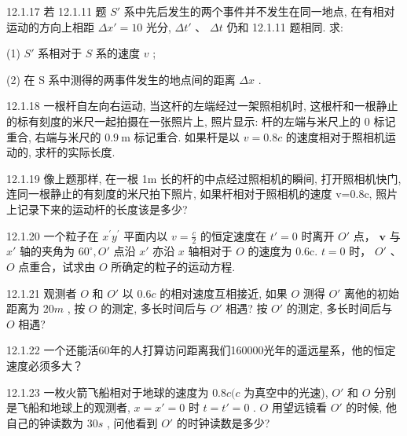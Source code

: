 \begin{problem}{12.1.17}
若 12.1.11 题 $S'$ 系中先后发生的两个事件并不发生在同一地点, 在有相对运动的方向上相距 $\Delta x' = 10$ 光分, $\Delta t'$ 、 $\Delta t$ 仍和 12.1.11 题相同. 求:

(1) $S'$ 系相对于 $S$ 系的速度 $v$ ;

(2) 在 S 系中测得的两事件发生的地点间的距离 $\Delta x$ .
\end{problem}
\clearpage


\begin{problem}{12.1.18}
一根杆自左向右运动, 当这杆的左端经过一架照相机时, 这根杆和一根静止的标有刻度的米尺一起拍摄在一张照片上, 照片显示: 杆的左端与米尺上的 0 标记重合, 右端与米尺的 $0.9 \mathrm{~m}$ 标记重合. 如果杆是以 $v = 0.8 c$ 的速度相对于照相机运动的, 求杆的实际长度.
\end{problem}
\clearpage


\begin{problem}{12.1.19}
像上题那样, 在一根 1m 长的杆的中点经过照相机的瞬间, 打开照相机快门, 连同一根静止的有刻度的米尺拍下照片, 如果杆相对于照相机的速度 v=0.8c, 照片上记录下来的运动杆的长度该是多少?
\end{problem}
\clearpage


\begin{problem}{12.1.20}
一个粒子在 $x^{\prime}y^{\prime}$ 平面内以 $v = \frac{c}{2}$ 的恒定速度在 $t' = 0$ 时离开 $O'$ 点， $\bm{v}$ 与 $x'$ 轴的夹角为 $60^{\circ}, O'$ 点沿 $x'$ 亦沿 $x$ 轴相对于 $O$ 的速度为 0.6c. $t = 0$ 时， $O'$ 、 $O$ 点重合，试求由 $O$ 所确定的粒子的运动方程.
\end{problem}
\clearpage


\begin{problem}{12.1.21}
观测者 $O$ 和 $O'$ 以 $0.6c$ 的相对速度互相接近, 如果 $O$ 测得 $O'$ 离他的初始距离为 $20m$ , 按 $O$ 的测定, 多长时间后与 $O'$ 相遇? 按 $O'$ 的测定, 多长时间后与 $O$ 相遇?
\end{problem}
\clearpage


\begin{problem}{12.1.22}
一个还能活60年的人打算访问距离我们160000光年的遥远星系，他的恒定速度必须多大？
\end{problem}
\clearpage


\begin{problem}{12.1.23}
一枚火箭飞船相对于地球的速度为 $0.8c(c$ 为真空中的光速), $O'$ 和 $O$ 分别是飞船和地球上的观测者, $x = x' = 0$ 时 $t = t' = 0$ . $O$ 用望远镜看 $O'$ 的时候, 他自己的钟读数为 $30s$ , 问他看到 $O'$ 的时钟读数是多少?
\end{problem}
\clearpage


